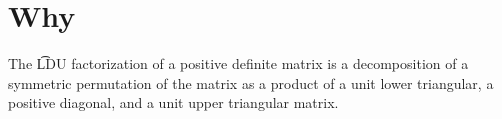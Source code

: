
\section{Why}

The \t{LDU factorization} of a positive definite matrix is a decomposition of a symmetric permutation of the matrix as a product of a unit lower triangular, a positive diagonal, and a unit upper triangular matrix.


$$
$$
